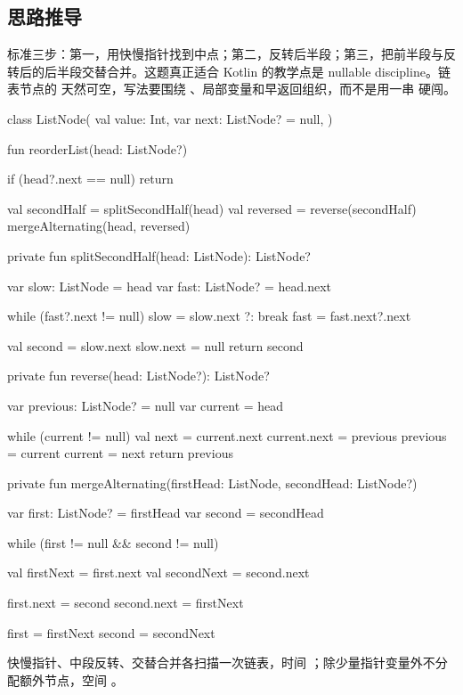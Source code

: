 \subsection*{思路推导}

标准三步：第一，用快慢指针找到中点；第二，反转后半段；第三，把前半段与反转后的后半段交替合并。这题真正适合 Kotlin 的教学点是 nullable discipline。链表节点的  天然可空，写法要围绕 、局部变量和早返回组织，而不是用一串 \code{!!} 硬闯。

\begin{kotlin}
class ListNode(
    val value: Int,
    var next: ListNode? = null,
)

fun reorderList(head: ListNode?) {
    if (head?.next == null) return

    val secondHalf = splitSecondHalf(head)
    val reversed = reverse(secondHalf)
    mergeAlternating(head, reversed)
}

private fun splitSecondHalf(head: ListNode): ListNode? {
    var slow: ListNode = head
    var fast: ListNode? = head.next

    while (fast?.next != null) {
        slow = slow.next ?: break
        fast = fast.next?.next
    }

    val second = slow.next
    slow.next = null
    return second
}

private fun reverse(head: ListNode?): ListNode? {
    var previous: ListNode? = null
    var current = head

    while (current != null) {
        val next = current.next
        current.next = previous
        previous = current
        current = next
    }
    return previous
}

private fun mergeAlternating(firstHead: ListNode, secondHead: ListNode?) {
    var first: ListNode? = firstHead
    var second = secondHead

    while (first != null && second != null) {
        val firstNext = first.next
        val secondNext = second.next

        first.next = second
        second.next = firstNext

        first = firstNext
        second = secondNext
    }
}
\end{kotlin}

\begin{keypoint}[复杂度]
快慢指针、中段反转、交替合并各扫描一次链表，时间 ；除少量指针变量外不分配额外节点，空间 。
\end{keypoint}

